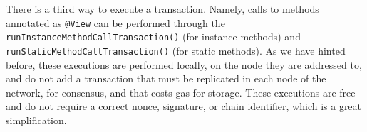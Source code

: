 There is a third way to execute a transaction. Namely, calls to methods
annotated as \texttt{@View} can be performed through the
\texttt{runInstanceMethodCallTransaction()} (for instance methods) and
\texttt{runStaticMethodCallTransaction()} (for static methods).
As we have hinted before, these executions are performed
locally, on the node they are addressed to, and do not add a transaction
that must be replicated in each node of the network, for consensus, and
that costs gas for storage.
These executions are free and do not require a correct nonce, signature,
or chain identifier, which is a great simplification.
